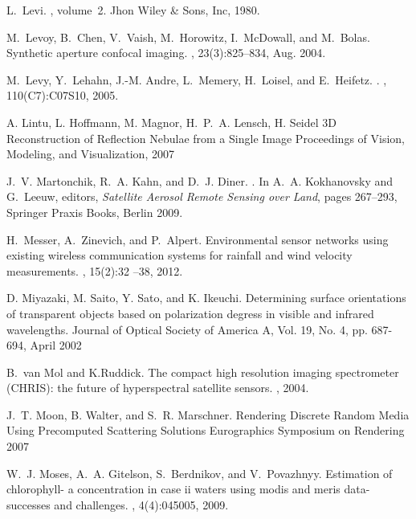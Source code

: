 \documentclass[10pt,twocolumn,letterpaper]{article}
\begin{document}
{\begin{thebibliography}{10}
L.~Levi.
, volume~2.
\newblock Jhon Wiley \& Sons, Inc, 1980.

M.~Levoy, B.~Chen, V.~Vaish, M.~Horowitz, I.~McDowall, and M.~Bolas.
\newblock Synthetic aperture confocal imaging.
, 23(3):825--834, Aug. 2004.

M.~Levy, Y.~Lehahn, J.-M. Andre, L.~Memery, H.~Loisel, and E.~Heifetz.
.
, 110(C7):C07S10, 2005.

A. Lintu, L. Hoffmann, M. Magnor, H.~P.~A. Lensch, H. Seidel
\newblock 3D Reconstruction of Reflection Nebulae from a Single Image
\newblock Proceedings of Vision, Modeling, and Visualization, 2007

J.~V. Martonchik, R.~A. Kahn, and D.~J. Diner.
.
\newblock In A.~A. Kokhanovsky and G.~Leeuw, editors, {\em Satellite Aerosol
  Remote Sensing over Land}, pages 267--293, Springer Praxis Books,
  Berlin 2009.

H.~Messer, A.~Zinevich, and P.~Alpert.
\newblock Environmental sensor networks using existing wireless communication
  systems for rainfall and wind velocity measurements.
, 15(2):32 --38,
  2012.

D. Miyazaki, M. Saito, Y. Sato, and K. Ikeuchi.
\newblock Determining surface orientations of transparent objects based on polarization degress in visible and infrared wavelengths.
\newblock Journal of Optical Society of America A, Vol. 19, No. 4, pp. 687-694, April 2002

B.~van Mol and K.Ruddick.
\newblock The compact high resolution imaging spectrometer (CHRIS): the future
  of hyperspectral satellite sensors.
, 2004.

J.~T. Moon, B. Walter, and S.~R. Marschner.
\newblock Rendering Discrete Random Media Using Precomputed Scattering Solutions
\newblock Eurographics Symposium on Rendering 2007 

W.~J. Moses, A.~A. Gitelson, S.~Berdnikov, and V.~Povazhnyy.
\newblock Estimation of chlorophyll- a concentration in case ii waters using
  modis and meris data-successes and challenges.
, 4(4):045005, 2009.


\end{thebibliography}}
\end{document}
